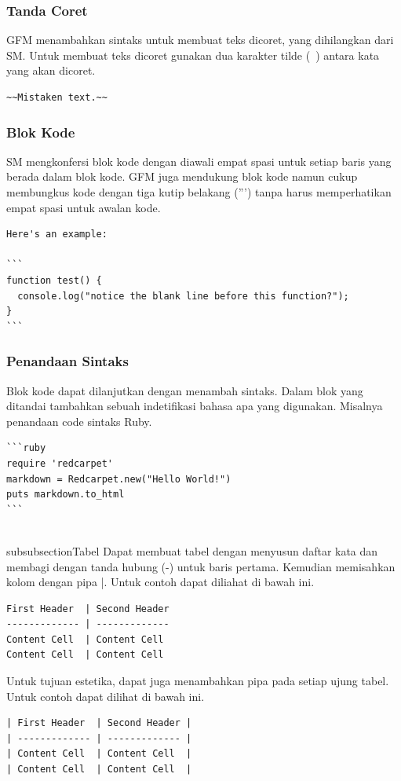 \begin{enumerate}
\subsubsection{Tanda Coret}
GFM menambahkan sintaks untuk membuat teks dicoret, yang dihilangkan dari SM. Untuk membuat teks dicoret gunakan dua karakter tilde (~) antara kata yang akan dicoret.
\begin{lstlisting}
~~Mistaken text.~~
\end{lstlisting}

\subsubsection{Blok Kode}
SM mengkonfersi blok kode dengan diawali empat spasi untuk setiap baris yang berada dalam blok kode. GFM juga mendukung blok kode namun cukup membungkus kode dengan tiga kutip belakang (''') tanpa harus memperhatikan empat spasi untuk awalan kode.
\begin{lstlisting}
Here's an example:

```
function test() {
  console.log("notice the blank line before this function?");
}
```
\end{lstlisting}

\subsubsection{Penandaan Sintaks}
Blok kode dapat dilanjutkan dengan menambah sintaks. Dalam blok yang ditandai tambahkan sebuah indetifikasi bahasa apa yang digunakan. Misalnya penandaan code sintaks Ruby.
\begin{lstlisting}
```ruby
require 'redcarpet'
markdown = Redcarpet.new("Hello World!")
puts markdown.to_html
```
\end{lstlisting}

\\subsubsection{Tabel}
Dapat membuat tabel dengan menyusun daftar kata dan membagi dengan tanda hubung (-) untuk baris pertama. Kemudian memisahkan kolom dengan pipa |. Untuk contoh dapat diliahat di bawah ini.
\begin{lstlisting}
First Header  | Second Header
------------- | -------------
Content Cell  | Content Cell
Content Cell  | Content Cell
\end{lstlisting}

Untuk tujuan estetika, dapat juga menambahkan pipa pada setiap ujung tabel. Untuk contoh dapat dilihat di bawah ini.
\begin{lstlisting}
| First Header  | Second Header |
| ------------- | ------------- |
| Content Cell  | Content Cell  |
| Content Cell  | Content Cell  |
\end{lstlisting}


\end{enumerate}
